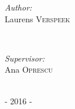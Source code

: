 \documentclass{report}
\begin{document}
\begin{titlepage}
	\begin{minipage}{0.4\textwidth}
		\begin{flushleft} \large
			\emph{Author:}\\
			Laurens \textsc{Verspeek} %
		\end{flushleft}
	\end{minipage}
	~
	\begin{minipage}{0.4\textwidth}
		\begin{flushright} \large
			\emph{Supervisor:} \\
			Ana \textsc{Oprescu} %
		\end{flushright}
	\end{minipage}\\[2cm]
	
	
	
	{\large - 2016 -}\\[2cm] %
	
	
	
	\vfill %
	
\end{titlepage}
\thispagestyle{plain}
\pagestyle{fancy}
\fancyhf{}
\fancyhead[L]{\nouppercase{\leftmark}}
\fancyhead[R]{\thepage}
\end{document}
